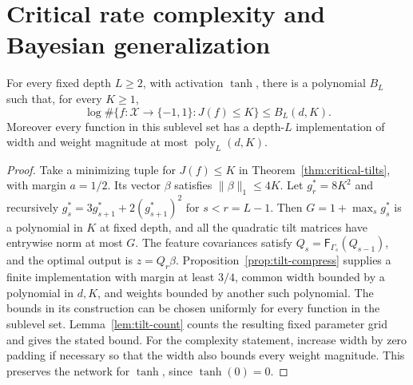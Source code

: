 \section{Critical rate complexity and Bayesian generalization}
\begin{theorem}\label{thm:critical-counting}
For every fixed depth $L\geq2$, with activation $\tanh$, there is a polynomial
$B_L$ such that, for every $K\geq1$,
\[
 \log\#\{f:\mathcal X\to\{-1,1\}:J(f)\leq K\}\leq B_L(d,K).
\]
Moreover every function in this sublevel set has a depth-$L$ implementation
of width and weight magnitude at most $\operatorname{poly}_L(d,K)$.
\end{theorem}
\begin{proof}
Take a minimizing tuple for $J(f)\leq K$ in
Theorem~\ref{thm:critical-tilts}, with margin $a=1/2$.
Its vector $\beta$ satisfies $\|\beta\|_1\leq4K$.
Let $g_r^*=8K^2$ and recursively
$g_s^*=3g_{s+1}^*+2(g_{s+1}^*)^2$ for $s<r=L-1$.
Then $G=1+\max_s g_s^*$ is a polynomial in $K$ at fixed depth,
and all the quadratic tilt matrices have entrywise norm at most $G$.
The feature covariances satisfy
$Q_s=\mathsf F_{\Gamma_s}(Q_{s-1})$, and the optimal output is
$z=Q_r\beta$.
Proposition~\ref{prop:tilt-compress} supplies a finite implementation with
margin at least $3/4$, common width bounded by a polynomial in $d,K$, and
weights bounded by another such polynomial.
The bounds in its construction can be chosen uniformly for every function
in the sublevel set. Lemma~\ref{lem:tilt-count} counts the resulting fixed
parameter grid and gives the stated bound.
For the complexity statement, increase width by zero padding if necessary
so that the width also bounds every weight magnitude. This preserves the
network for $\tanh$, since $\tanh(0)=0$.
\end{proof}

